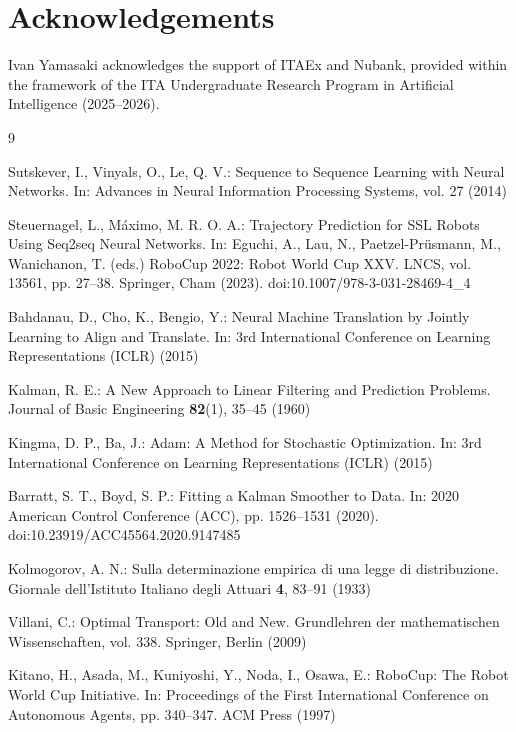 \documentclass[runningheads]{llncs}
\begin{document}
\section*{Acknowledgements}
Ivan Yamasaki acknowledges the support of ITAEx and Nubank, provided within the framework of the ITA Undergraduate Research Program in Artificial Intelligence (2025--2026).

\begin{thebibliography}{9}

Sutskever, I., Vinyals, O., Le, Q. V.: Sequence to Sequence Learning with Neural Networks. In: Advances in Neural Information Processing Systems, vol. 27 (2014)

Steuernagel, L., M\'aximo, M. R. O. A.: Trajectory Prediction for SSL Robots Using Seq2seq Neural Networks. In: Eguchi, A., Lau, N., Paetzel-Pr\"usmann, M., Wanichanon, T. (eds.) RoboCup 2022: Robot World Cup XXV. LNCS, vol. 13561, pp. 27--38. Springer, Cham (2023). doi:10.1007/978-3-031-28469-4\_4

Bahdanau, D., Cho, K., Bengio, Y.: Neural Machine Translation by Jointly Learning to Align and Translate. In: 3rd International Conference on Learning Representations (ICLR) (2015)

Kalman, R. E.: A New Approach to Linear Filtering and Prediction Problems. Journal of Basic Engineering \textbf{82}(1), 35--45 (1960)

Kingma, D. P., Ba, J.: Adam: A Method for Stochastic Optimization. In: 3rd International Conference on Learning Representations (ICLR) (2015)

Barratt, S. T., Boyd, S. P.: Fitting a Kalman Smoother to Data. In: 2020 American Control Conference (ACC), pp. 1526--1531 (2020). doi:10.23919/ACC45564.2020.9147485

Kolmogorov, A. N.: Sulla determinazione empirica di una legge di distribuzione. Giornale dell'Istituto Italiano degli Attuari \textbf{4}, 83--91 (1933)

Villani, C.: Optimal Transport: Old and New. Grundlehren der mathematischen Wissenschaften, vol. 338. Springer, Berlin (2009)

Kitano, H., Asada, M., Kuniyoshi, Y., Noda, I., Osawa, E.: RoboCup: The Robot World Cup Initiative. In: Proceedings of the First International Conference on Autonomous Agents, pp. 340--347. ACM Press (1997)


\end{thebibliography}
\end{document}
